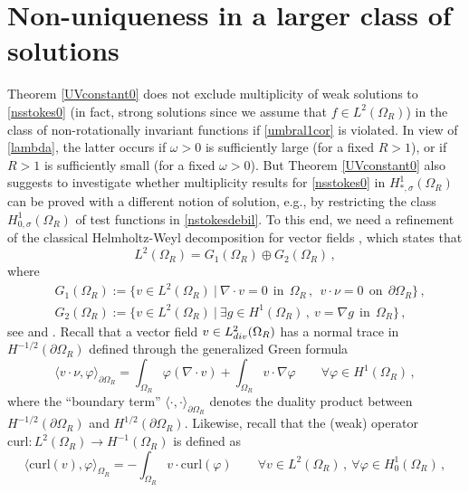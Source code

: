 \documentclass[a4paper,11pt]{article}
\numberwithin{equation}{section}
\numberwithin{figure}{section}
\begin{document}
\section{Non-uniqueness in a larger class of solutions} \label{singsolutions}

Theorem \ref{UVconstant0} does not exclude multiplicity of weak solutions to \eqref{nsstokes0}
(in fact, strong solutions since we assume that $f\in L^2(\Omega_R)$) in the class of non-rotationally invariant
functions if \eqref{umbral1cor} is violated. In view of \eqref{lambda}, the latter occurs if $\omega>0$ is
sufficiently large (for a fixed $R>1$), or if $R > 1$ is sufficiently small (for a fixed $\omega>0$). But Theorem \ref{UVconstant0} also
suggests to investigate whether multiplicity results for \eqref{nsstokes0} in $H^{1}_{*,\sigma}(\Omega_{R})$ can be proved with a
different notion of solution, e.g., by restricting the class $H^{1}_{0,\sigma}(\Omega_{R})$ of test functions in \eqref{nstokesdebil}.
To this end, we need a refinement of the classical Helmholtz-Weyl decomposition for vector fields \cite{Helmholtz}, which states that
\begin{equation}\label{HW}
L^2(\Omega_R)=G_{1}(\Omega_R) \oplus G_{2}(\Omega_R) \, ,
\end{equation}
where
$$
\begin{aligned}
& G_{1}(\Omega_R) := \{v \in L^2(\Omega_R) \ | \ \nabla \cdot v = 0 \ \ \text{in} \ \ \Omega_{R} \, , \ \ v \cdot \nu = 0 \ \ \text{on} \ \
\partial \Omega_{R} \} \, , \\[6pt]
& G_{2}(\Omega_R) := \{v\in L^2(\Omega_R) \ | \ \exists g\in H^1(\Omega_R) \, , \ v=\nabla g \ \ \text{in} \ \ \Omega_{R} \}\, ,
\end{aligned}
$$
see \cite[Section 1]{foiastemam78} and \cite[Chapter 1]{ladyzhenskaya1969mathematical}. Recall that a vector field $v \in L^2_{\rm div}(\Omega_R)$
has
a normal trace in $H^{-1/2}(\partial \Omega_{R})$ defined through the generalized Green formula
$$
\langle v \cdot \nu , \varphi \rangle_{\partial \Omega_{R}} = \int_{\Omega_{R}} \varphi(\nabla \cdot v) + \int_{\Omega_{R}} v \cdot \nabla \varphi
\qquad \forall \varphi \in H^{1}(\Omega_{R}) \, ,
$$
where the ``boundary term'' $\langle\cdot,\cdot\rangle_{\partial \Omega_{R}}$ denotes the duality product between $H^{-1/2}(\partial \Omega_{R})$
and $H^{1/2}(\partial \Omega_{R})$. Likewise, recall that the (weak)
operator $\text{curl} : L^2(\Omega_R) \longrightarrow H^{-1}(\Omega_{R})$ is defined as
$$
\langle \text{curl}(v) , \varphi \rangle_{\Omega_{R}} = - \int_{\Omega_{R}} v \cdot \text{curl}(\varphi) \qquad \forall v \in L^2(\Omega_R) \, , \ \forall \varphi \in H_{0}^{1}(\Omega_{R}) \, ,
$$
\end{document}
